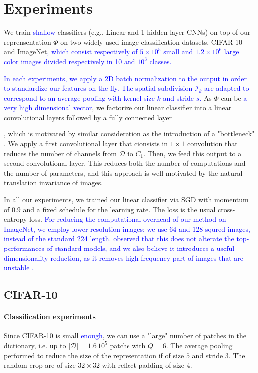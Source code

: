 \documentclass{article}
\newcommand{\Edouard}[1]{\textcolor{blue}{#1}}
\begin{document}
{\section{Experiments}
\label{experiments}
We train  \Edouard{shallow} classifiers (e.g., Linear and 1-hidden layer CNNs) on top of our reprensentation $\Phi$ on two widely used image classification datasets,  CIFAR-10 and ImageNet\Edouard{, which consist respectively of $5\times10^5$ small and $1.2\times10^6$ large color images  divided respectively in 10 and $10^3$ classes.}


\Edouard{In each experiments, we apply a 2D batch normalization to the output \Edouard{in order to standardize our features on the fly}. The spatial subdivision $\mathcal{I}_k$ are adapted to correspond to an average pooling with kernel size $k$ and stride $s$. }As  $\Phi$ can be \Edouard{a very high dimensional vector}, we factorize our linear classifier into a linear convolutional layers followed by a fully connected layer}, which is motivated by similar consideration as the introduction of a "bottleneck" \cite{ResNet}. We apply a first convolutional layer that cionsists in $1\times 1$ convolution that reduces the number of channels from $\mathcal{D}$ to $C_1$. Then, we feed this output to a second convolutional layer.
This reduces both the number of computations and the number of parameters, and this approach is well motivated by the natural translation invariance of images.

In all our experiments, we trained our linear classifier via SGD with momentum of 0.9 and a fixed schedule for the learning rate.
The loss is the usual cross-entropy loss. \Edouard{ For reducing the computational overhead of our method on ImageNet, we employ lower-resolution images: we use 64 and 128 squred images, instead of the standard 224 length.  \cite{DBLP:journals/corr/ChrabaszczLH17} observed that this does not alterate the top-performances of standard models, and we also believe it introduces a useful dimensionality reduction, as it removes high-frequency part of images that are unstable \citet{chjdq}.} 


\subsection{CIFAR-10}

\paragraph{Classification experiments} Since CIFAR-10 is small \Edouard{enough}, we can use a "large" number of patches in the dictionary, i.e. up to $|\mathcal{D}|=1.6\,10^5$ patche with $Q = 6$.
The average pooling performed to reduce the size of the representation if of size $5$ and stride $3$.
The random crop are of size $32\times 32$ with reflect padding of size $4$.
\end{document}
